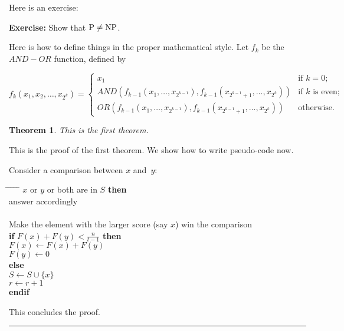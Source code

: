 \documentclass[twoside]{article}
\newcounter{lecnum}
\newtheorem{theorem}{Theorem}[lecnum]
\newenvironment{proof}{{\bf Proof:}}{\hfill\rule{2mm}{2mm}}
\begin{document}
Here is an exercise:

{\bf Exercise:}  Show that ${\rm P}\ne{\rm NP}$.

Here is how to define things in the proper mathematical style.
Let $f_k$ be the $AND-OR$ function, defined by

\[ f_k(x_1, x_2, \ldots, x_{2^k}) = \left\{ \begin{array}{ll}

	x_1 & \mbox{if $k = 0$;} \\

	AND(f_{k-1}(x_1, \ldots, x_{2^{k-1}}),
	   f_{k-1}(x_{2^{k-1} + 1}, \ldots, x_{2^k}))
	 & \mbox{if $k$ is even;} \\

	OR(f_{k-1}(x_1, \ldots, x_{2^{k-1}}),
	   f_{k-1}(x_{2^{k-1} + 1}, \ldots, x_{2^k}))	
	& \mbox{otherwise.} 
	\end{array}
	\right. \]

\begin{theorem}
This is the first theorem.
\end{theorem}

\begin{proof}
This is the proof of the first theorem. We show how to write pseudo-code now.

Consider a comparison between $x$ and~$y$:
\begin{tabbing}
\hspace*{.25in} \= \hspace*{.25in} \= \hspace*{.25in} \= \hspace*{.25in} \= \hspace*{.25in} \=\kill
{} $x$ or $y$ or both are in $S$ {\bf then } \\
\>\> answer accordingly \\
 \\
\>\>    Make the element with the larger score (say $x$) win the comparison \\
\>\> {\bf if} $F(x) + F(y) < \frac{n}{t-1}$ {\bf then} \\%
\>\>\> $F(x) \leftarrow F(x) + F(y)$ \\
\>\>\> $F(y) \leftarrow 0$ \\
\>\> {\bf else}  \\
\>\>\> $S \leftarrow S \cup \{ x \} $ \\
\>\>\> $r \leftarrow r+1$ \\
\>\> {\bf endif} \\
\end{tabbing}

This concludes the proof.
\end{proof}
\end{document}
